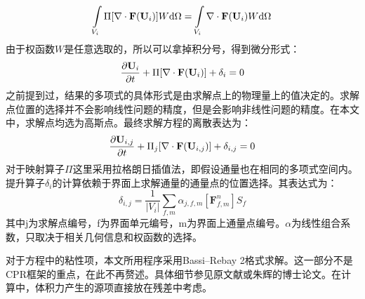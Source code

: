 \begin{equation}
  \int\limits_{V_i}\Pi [\nabla \cdot \mathbf{F}(\mathbf{U}_i)]W{\rm d}\Omega 
  = \int\limits_{V_i}\nabla \cdot \mathbf{F}(\mathbf{U}_i)W{\rm d}\Omega
\end{equation}
由于权函数$W$是任意选取的，所以可以拿掉积分号，得到微分形式：
\begin{equation}
  \frac{\partial \mathbf{U}_i}{\partial t} + \Pi[\nabla \cdot \mathbf{F}(\mathbf{U}_i)]  + \delta_i = 0
\end{equation}
之前提到过，结果的多项式的具体形式是由求解点上的物理量上的值决定的。求解点位置的选择并不会影响线性问题的精度，但是会影响非线性问题的精度。在本文中，求解点均选为高斯点。最终求解方程的离散表达为：
\begin{equation}
  \frac{\partial \mathbf{U}_{i,j}}{\partial t} + \Pi_j[\nabla \cdot \mathbf{F}(\mathbf{U}_{i,j})]  + \delta_{i,j} = 0
\end{equation}
对于映射算子$\Pi$这里采用拉格朗日插值法，即假设通量也在相同的多项式空间内。提升算子$\delta_i$的计算依赖于界面上求解通量的通量点的位置选择。其表达式为：
\begin{equation}
  \delta_{i,j}=\frac{1}{\left| V_i\right|}\sum\limits_{f,m}\alpha_{j,f,m}[\mathbf{F}^n_{f,m}]S_f
\end{equation}
其中j为求解点编号，f为界面单元编号，m为界面上通量点编号。$\alpha$为线性组合系数，只取决于相关几何信息和权函数的选择。

对于方程中的粘性项，本文所用程序采用Bassi–Rebay 2格式求解\cite{Bassi1997}。这一部分不是CPR框架的重点，在此不再赘述。具体细节参见原文献或朱辉的博士论文\cite{zhuhui}。在计算中，体积力产生的源项直接放在残差中考虑。